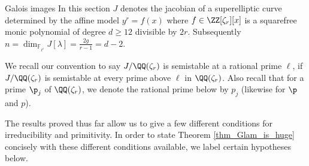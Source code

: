 \documentclass[11pt,a4paper]{article}
\newcommand{\Fli}{\mathbb{F}_{\ell^i}}
\newcommand{\Qr}{{\QQ(\zeta_r)}}
\newcommand{\Zr}{{\ZZ[\zeta_r]}}
\begin{document}
\begin{section}{Galois images}
\label{section_Galois_images}
In this section $J$ denotes the jacobian of a superelliptic curve determined by the affine model $y^r = f(x)$ where $f \in \Zr[x]$ is a squarefree monic polynomial of degree $d \geq 12$ divisible by $2r$.
Subsequently $n = \dim_{\Fli}J[\lambda] = \frac{2g}{r-1}=d-2$.

We recall our convention to say $J/\Qr$ is semistable at a rational prime $\ell$, if $J/\Qr$ is semistable at every prime above $\ell$ in $\Qr$.
Also recall that for a prime $\p_j$ of $\Qr$, we denote the rational prime below by $p_j$ (likewise for $\p$ and $p$).

The results proved thus far allow us to give a few different conditions for irreducibility and primitivity. In order to state Theorem \ref{thm_Glam_is_huge} concisely with these different conditions available, we label certain hypotheses below.


\end{section}
\end{document}
